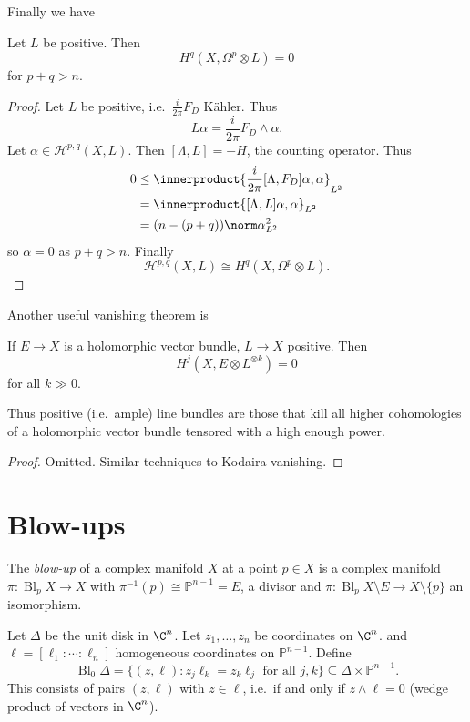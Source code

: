 \documentclass[a4paper]{article}
\renewcommand{\P}{\mathbb P} %
\newcommand{\w}{\wedge} %
\newcommand*{\ip}{\innerproduct}
\DeclareMathOperator{\Bl}{Bl} %
\begin{document}
Finally we have

\begin{theorem}
  Let \(L\) be positive. Then
  \[
    H^q(X, \Omega^p \otimes L) = 0
  \]
  for \(p + q > n\).
\end{theorem}

\begin{proof}
  Let \(L\) be positive, i.e.\ \(\frac{i}{2\pi} F_D\) Kähler. Thus
  \[
    L\alpha = \frac{i}{2\pi} F_D \w \alpha.
  \]
  Let \(\alpha \in \mathcal H^{p, q}(X, L)\). Then \([\Lambda, L] = -H\), the counting operator. Thus
  \begin{align*}
    0
    &\leq \ip{\frac{i}{2\pi} [\Lambda, F_D]\alpha, \alpha}_{L^2} \\
    &= \ip{[\Lambda, L] \alpha, \alpha}_{L^2} \\
    &= (n - (p + q)) \norm \alpha_{L^2}^2
  \end{align*}
  so \(\alpha = 0\) as \(p + q > n\). Finally
  \[
    \mathcal H^{p, q}(X, L) \cong H^q(X, \Omega^p \otimes L).
  \]
\end{proof}

Another useful vanishing theorem is
\begin{theorem}
  If \(E \to X\) is a holomorphic vector bundle, \(L \to X\) positive. Then
  \[
    H^j(X, E \otimes L^{\otimes k}) = 0
  \]
  for all \(k \gg 0\).
\end{theorem}
Thus positive (i.e.\ ample) line bundles are those that kill all higher cohomologies of a holomorphic vector bundle tensored with a high enough power.

\begin{proof}
  Omitted. Similar techniques to Kodaira vanishing.
\end{proof}

\section{Blow-ups}

The \emph{blow-up} of a complex manifold \(X\) at a point \(p \in X\) is a complex manifold \(\pi: \Bl_p X \to X\) with \(\pi^{-1}(p) \cong \P^{n - 1} = E\), a divisor and \(\pi: \Bl_p X \setminus E \to X \setminus \{p\}\) an isomorphism.

Let \(\Delta\) be the unit disk in \(\C^n\). Let \(z_1, \dots, z_n\) be coordinates on \(\C^n\). and \(\ell = [\ell_1: \cdots : \ell_n]\) homogeneous coordinates on \(\P^{n - 1}\). Define
\[
  \Bl_0 \Delta = \{(z, \ell): z_j \ell_k = z_k \ell_j \text{ for all } j, k\} \subseteq \Delta \times \P^{n - 1}.
\]
This consists of pairs \((z, \ell)\) with \(z \in \ell\), i.e.\ if and only if \(z \w \ell = 0\) (wedge product of vectors in \(\C^n\)).
\end{document}
